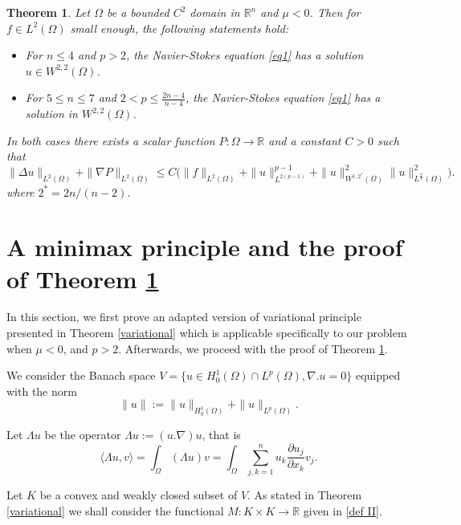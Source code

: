 \documentclass[10pt,a4paper]{amsart}
\numberwithin{equation}{section}
\newtheorem{theorem}{Theorem}[section]
\begin{document}
\setcounter{theorem}{1}
\begin{theorem}\label{main theorem 1}
Let \(\Omega\) be a  bounded \(C^2\) domain in \(\mathbb{R} ^n\) and  \(\mu<0\).
Then for \(f\in L^2(\Omega) \) small enough,  the following statements hold:
 \begin{itemize}
 \item[(i)] For \(n\leq 4\) and \(p>2\), the Navier-Stokes equation
     \eqref{eq1} has a  solution \(u \in  W^{2,2}(\Omega)  \).

 \item[(ii)] For \(5\leq n\leq 7\) and  \( 2< p \leq \frac{2n-4}{n-4}\),
 the Navier-Stokes equation \eqref{eq1} has a  solution in \( W^{2,2}(\Omega)\).
 \end{itemize}
In both cases there exists a scalar function $P:\Omega \to \mathbb{R}$ and a constant $C>0$
such that
\begin{equation} \label{nabla11}
     \rVert \Delta {u} \rVert_{L^2(\Omega)}+\rVert \nabla P \rVert_{L^2(\Omega)}
     \leq C\big( \rVert f\rVert_{L^2(\Omega)}+\rVert u\rVert^{p-1}_{L^{2(p-1)}}
     +\rVert {u}\rVert^{2}_{W^{1,2^*}(\Omega)} \rVert  {u}\rVert^2_{L^{\frac{n}{2}}(\Omega)} \big) .
\end{equation}
  where $2^*=2n/(n-2)$.
\end{theorem}

\section{A minimax principle and the proof of Theorem \ref{main theorem 1}}

In this section, we first prove an adapted version of  variational principle
presented in Theorem \ref{variational} which is  applicable specifically to our
problem when \(\mu<0\), and $p>2$. Afterwards, we proceed with the proof of
Theorem \ref{main theorem 1}.

 We  consider the Banach space
\(
V= \{ u\in H_0^1(\Omega)\cap L^p(\Omega),\nabla . u=0\}
\)
equipped with the  norm
\[
\rVert u \rVert:= \rVert u \rVert_{ H_0^{1}(\Omega)}
+\rVert u \rVert_{ L^{p}(\Omega)}.
\]

Let \(\Lambda u\) be the operator \(\Lambda u := (u . \nabla)u\), that is
\[
\langle \Lambda u, v\rangle
= \int_\Omega (\Lambda u)v =\int_\Omega\sum_{j,k=1}^n
u_k\frac{\partial u_j}{\partial x_k}v_j.
\]

Let \( K\) be a convex and weakly closed subset of \(V\).
As stated in Theorem \ref{variational} we shall consider the functional
\( M : K \times K \to\mathbb{R}\) given in  \eqref{def II}.
\end{document}
